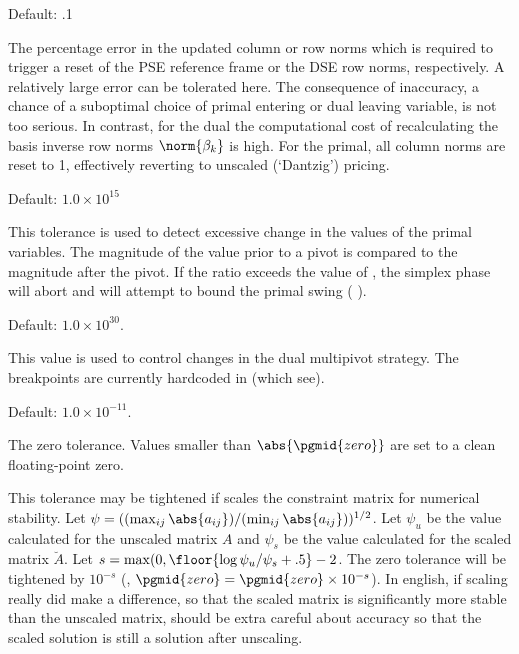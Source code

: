 \begin{codedoc}
  Default: .1

  The percentage error in the updated column or row norms which is required
  to trigger a reset of the PSE reference frame or the DSE row norms,
  respectively.
  A relatively large error can be tolerated here.
  The consequence of inaccuracy, a chance of a suboptimal choice of primal
  entering or dual leaving variable, is not too serious.
  In contrast, for the dual the computational cost of recalculating the
  basis inverse row norms $\norm{\beta_k}$ is high.
  For the primal, all column norms are reset to 1, effectively reverting to
  unscaled (`Dantzig') pricing.

  \item{}
    \kw{;}

  Default: $1.0 \times 10^{15}$

  This tolerance is used to detect excessive change in the values of the primal
  variables.
  The magnitude of the value prior to a pivot is compared to the magnitude
  after the pivot.
  If the  ratio exceeds the value of , the simplex phase will
  abort and \dylp will attempt to bound the primal swing (\vid
  ).

  \item{}

  Default: $1.0\times 10^{30}$.

  This value is used to control changes in the dual multipivot strategy.
  The breakpoints are currently hardcoded in
   (which see).

  \item{}
    \kw{;}

  Default: $1.0\times 10^{-11}$.

  The zero tolerance.
  Values smaller than $\abs{\pgmid{zero}}$ are set to a clean floating-point
  zero.

  This tolerance may be tightened if \dylp scales the constraint matrix for
  numerical stability.
  Let $\psi = ((\max_{ij} \abs{a_{ij}})/(\min_{ij} \abs{a_{ij}}))^{1/2}$.
  Let $\psi_u$ be the value calculated for the unscaled matrix $A$ and
  $\psi_s$ be the value calculated for the scaled matrix $\breve{A}$.
  Let $s = \max (0, \floor{\log \psi_u/\psi_s + .5}-2$.
  The zero tolerance will be tightened by $10^{-s}$
  (\ie, $\pgmid{zero} = \pgmid{zero} \times 10^{-s}$).
  In english, if scaling really did make a
  difference, so that the scaled matrix is significantly more stable than the
  unscaled matrix, \dylp should be extra careful about accuracy so that the
  scaled solution is still a solution after unscaling.

\end{codedoc}
